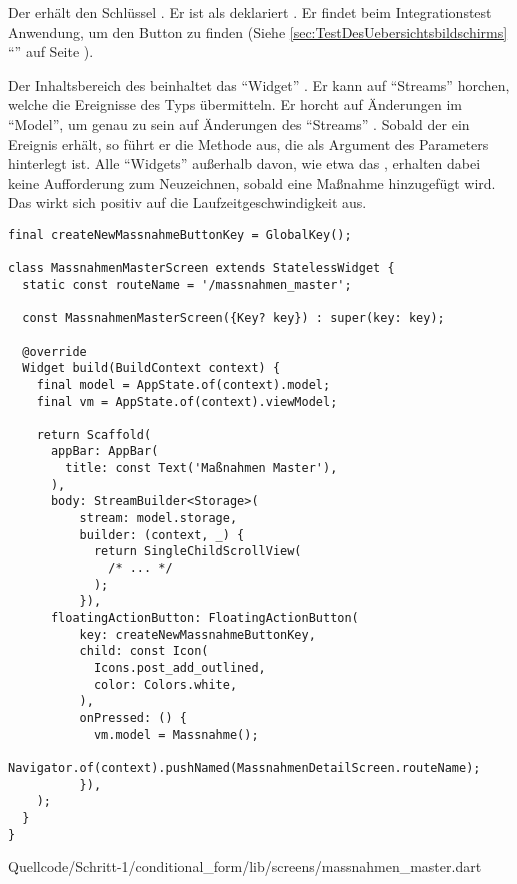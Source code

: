 Der  erhält den Schlüssel  .
Er ist als  deklariert .
Er findet beim Integrationstest Anwendung, um den Button zu finden (Siehe \ref{sec:TestDesUebersichtsbildschirms} \enquote{} auf Seite \pageref{sec:TestDesUebersichtsbildschirms}).

Der Inhaltsbereich des  beinhaltet das \enquote{Widget}  .
Er kann auf \enquote{Streams} horchen, welche die Ereignisse des Typs  übermitteln.
Er horcht auf Änderungen im \enquote{Model}, um genau zu sein auf Änderungen des \enquote{Streams}  .
Sobald der  ein Ereignis erhält, so führt er die Methode aus, die als Argument des Parameters  hinterlegt ist.
Alle \enquote{Widgets} außerhalb davon, wie etwa das , erhalten dabei keine Aufforderung zum Neuzeichnen, sobald eine Maßnahme hinzugefügt wird.
Das wirkt sich positiv auf die Laufzeitgeschwindigkeit aus.


\ifIncludeFigures
  \begin{listing}[htbp]
    \let\oldtheFancyVerbLine\theFancyVerbLine
    \renewcommand\theFancyVerbLine{%
      \ifnum\value{FancyVerbLine}=31
      \setcounter{FancyVerbLine}{85}
      \else
      \oldtheFancyVerbLine%
      \fi
    }
    \begin{verbatim}
final createNewMassnahmeButtonKey = GlobalKey();

class MassnahmenMasterScreen extends StatelessWidget {
  static const routeName = '/massnahmen_master';

  const MassnahmenMasterScreen({Key? key}) : super(key: key);

  @override
  Widget build(BuildContext context) {
    final model = AppState.of(context).model;
    final vm = AppState.of(context).viewModel;

    return Scaffold(
      appBar: AppBar(
        title: const Text('Maßnahmen Master'),
      ),
      body: StreamBuilder<Storage>(
          stream: model.storage,
          builder: (context, _) {
            return SingleChildScrollView(
              /* ... */
            );
          }),
      floatingActionButton: FloatingActionButton(
          key: createNewMassnahmeButtonKey,
          child: const Icon(
            Icons.post_add_outlined,
            color: Colors.white,
          ),
          onPressed: () {
            vm.model = Massnahme();
            Navigator.of(context).pushNamed(MassnahmenDetailScreen.routeName);
          }),
    );
  }
}
\end{verbatim}
     {Quellcode/Schritt-1/conditional_form/lib/screens/massnahmen_master.dart}
    \label{lst:Schritt1KlasseMassnahmenMasterScreenStruktur}
  \end{listing}
\fi

